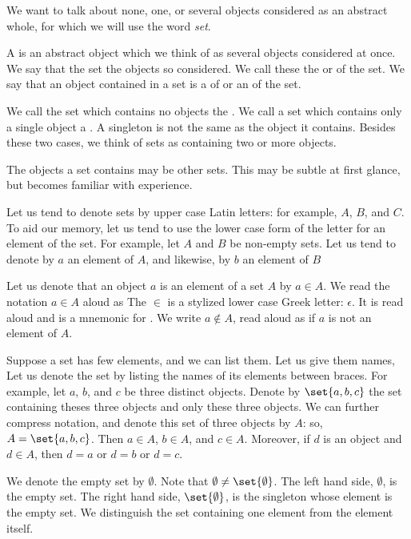 

We want to talk
about none, one, or
several objects considered
as an abstract whole,
for which we will use
the word \textit{set}.


A  is an abstract
object which we think of as
several objects considered
at once.
We say that the set
the objects so considered.
We call these
the
 or
 of the set.
We say that an object
contained in a set is a
 of or an
 of the set.

We call the set which contains
no objects the
.
We call
a set which contains
only a single object a
.
A singleton is not the
same as the object
it contains.
Besides these two cases,
we think of sets
as containing
two or more objects.

The objects a set contains
may be other sets.
This may be subtle at
first glance, but becomes
familiar with experience.


Let us tend to
denote sets by
upper case Latin letters:
for example,
$A$, $B$, and $C$.
To aid our memory,
let us tend to use the lower
case form of the letter for
an element of the set.
For example,
let $A$ and $B$ be
non-empty sets.
Let us tend to denote by
$a$ an element of $A$,
and likewise,
by $b$ an element of $B$

Let us denote that
an object $a$
is an element of a set $A$
by $a \in A$.
We read the notation
$a \in A$ aloud as 
The $\in$ is a stylized
lower case Greek letter: $\epsilon$.
It is
read aloud  and
is a mnemonic for .
We write $a \not\in A$, read aloud
as  if $a$ is not
an element of $A$.

Suppose a set has few elements,
and we can list them.
Let us give them names,
Let us denote the
set by listing
the names of its elements
between braces.
For example,
let $a$, $b$, and $c$
be three distinct objects.
Denote by $\set{a, b, c}$
the set containing theses
three objects and only these
three objects.
We can further compress notation,
and denote this set of
three objects by $A$:
so, $A = \set{a, b, c}$.
Then $a \in A$,
$b \in A$, and $c \in A$.
Moreover, if $d$
is an object and
$d \in A$, then $d = a$
or $d = b$ or $d = c$.

We denote the empty set
by $\emptyset$.
Note that
$\emptyset \neq \set{\emptyset}$.
The left hand side, $\emptyset$,
is the empty set.
The right hand side, $\set{\emptyset}$, is
the singleton whose element
is the empty set.
We distinguish the set
containing one element from the
element itself.


